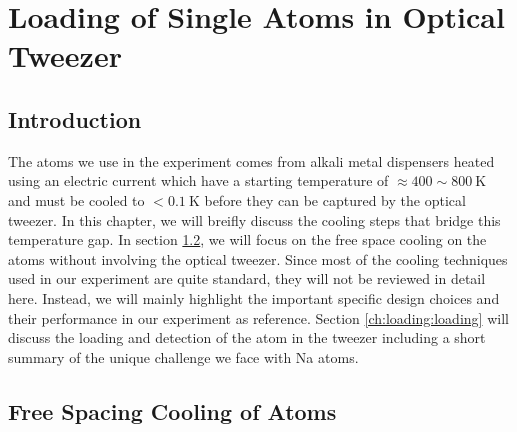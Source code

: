 
\chapter{Loading of Single Atoms in Optical Tweezer}
\label{ch:loading}

\section{Introduction}
\label{ch:loading:introduction}

The atoms we use in the experiment comes from alkali metal dispensers
heated using an electric current which have a starting temperature of
$\approx400\sim800~\mathrm{K}$ and must be cooled to $<0.1~\mathrm{K}$
before they can be captured by the optical tweezer.
In this chapter, we will breifly discuss the cooling steps that bridge this temperature gap.
In section \ref{ch:loading:free-space}, we will focus on the free space cooling
on the atoms without involving the optical tweezer.
Since most of the cooling techniques used in our experiment are quite standard,
they will not be reviewed in detail here.
Instead, we will mainly highlight the important specific design choices
and their performance in our experiment as reference.
Section \ref{ch:loading:loading} will discuss the loading and detection
of the atom in the tweezer including a short summary of the unique challenge
we face with Na atoms.

\section{Free Spacing Cooling of Atoms}
\label{ch:loading:free-space}

